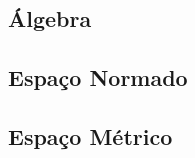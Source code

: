 \documentclass[twoside]{amsart}
\numberwithin{equation}{section}
\begin{document}
\begin{refsection}
\section{Álgebra}

\printbibliography[heading=subbibliography]
\end{refsection}


\begin{refsection}
\section{Espaço Normado}

\printbibliography[heading=subbibliography]
\end{refsection}


\begin{refsection}
\section{Espaço Métrico}

\printbibliography[heading=subbibliography]
\end{refsection}

\end{document}
